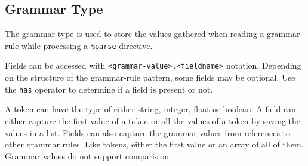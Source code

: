 
\subsection{Grammar Type}
{
	The grammar type is used to store the values
	gathered when reading a grammar rule while processing a \texttt{\%parse}
	directive.
	
	Fields can be accessed with \texttt{<grammar-value>.<fieldname>} notation.
	Depending on the structure of the grammar-rule pattern, some fields
	may be optional. Use the \texttt{has} operator to determine if a field
	is present or not.
	
	A token can have the type of either string, integer, float or boolean.
	A field can either capture the first value of a token or all the values
	of a token by saving the values in a list.
	Fields can also capture the grammar values from references to other
	grammar rules. Like tokens, either the first value or an array of all
	of them.
	Grammar values do not support comparision.
}
